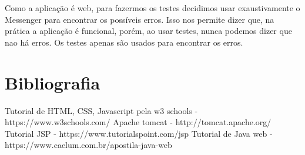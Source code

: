 \documentclass[12pt]{article}
\begin{document}
		Como a aplicação é web, para fazermos os testes decidimos usar exaustivamente o Messenger para encontrar os possíveis erros. Isso nos permite dizer que, na prática a aplicação é funcional, porém, ao usar testes, nunca podemos dizer que nao há erros. Os testes apenas são usados para encontrar os erros.

	\section{Bibliografia}

		Tutorial de HTML, CSS, Javascript pela w3 schools - https://www.w3schools.com/
		Apache tomcat - http://tomcat.apache.org/
		Tutorial JSP - https://www.tutorialspoint.com/jsp
		Tutorial de Java web - https://www.caelum.com.br/apostila-java-web
		
\end{document}
